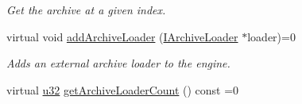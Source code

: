 \begin{DoxyCompactItemize}
\begin{DoxyCompactList}\small\item\em Get the archive at a given index. \end{DoxyCompactList}\item 
virtual void \hyperlink{classirr_1_1io_1_1IFileSystem_ad56456302b4697c49b461a909d9269b9}{add\+Archive\+Loader} (\hyperlink{classirr_1_1io_1_1IArchiveLoader}{I\+Archive\+Loader} $\ast$loader)=0
\begin{DoxyCompactList}\small\item\em Adds an external archive loader to the engine. \end{DoxyCompactList}\item 
virtual \hyperlink{namespaceirr_a0416a53257075833e7002efd0a18e804}{u32} \hyperlink{classirr_1_1io_1_1IFileSystem_abdd27df25640e6ea3a89e8261111b6fd}{get\+Archive\+Loader\+Count} () const  =0\hypertarget{classirr_1_1io_1_1IFileSystem_abdd27df25640e6ea3a89e8261111b6fd}{}\label{classirr_1_1io_1_1IFileSystem_abdd27df25640e6ea3a89e8261111b6fd}


\end{DoxyCompactItemize}
